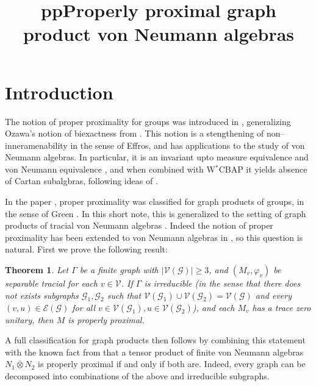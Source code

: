 \documentclass[a4paper, 11pt, reqno]{amsart}
\title{pp}
\numberwithin{equation}{section}
\theoremstyle{plain}
\newtheorem{thm}{Theorem}[section]
\theoremstyle{remark}
\theoremstyle{definition}
\newcommand{\VV}{{\mathcal V}}
\newcommand{\EE}{{\mathcal E}}
\newcommand{\GG}{{\mathcal G}}
\begin{document}
\title[Properly proximal graph product von Neumann algebras]{Properly proximal graph product von Neumann algebras}





\maketitle

\section{Introduction}

The notion of proper proximality for groups was introduced in \cite{BIP21}, generalizing Ozawa's notion of biexactness from \cite{Oza04}. This notion is a stengthening of non--inneramenability  in the sense of Effros, and has applications to the study of von Neumann algebras. In particular, it is an invariant upto measure equivalence and von Neumann equivalence \cite{IsPeRu19}, and when combined with W$^*$CBAP it yields absence of Cartan subalgbras, following ideas of \cite{OzPo10a}. 

In the paper \cite{DKE24properproximalgroups}, proper proximality was classified for graph products of groups, in the sense of Green \cite{Gr90}. In this short note, this is generalized to the setting of graph products of tracial von Neumann algebras \cite{CaFi17}. Indeed the notion of proper proximality has been extended to von Neumann algebras in \cite{DKEP23}, so this question is natural. First we prove the following result:

 \begin{thm}
     Let $\Gamma$ be a finite graph with $|\VV(\GG)|\geq 3$, and $(M_v,\varphi_v)$ be separable tracial for each $v\in \VV$. If $\Gamma$ is irreducible (in the sense that there does not exists subgraphs $\GG_1,\GG_2$ such that $ \VV(\GG_1)\cup \VV(\GG_2)=\VV(\GG) $ and every $(v,u)\in \EE(\GG) $ for all $v\in\VV(\GG_1),u\in \VV(\GG_2)$), and each $M_v$ has a trace zero unitary, then $M$ is properly proximal.
 \end{thm}  

 A full classification for graph products then follows by combining this statement with the known fact from \cite{DKEP23} that a tensor product of finite von Neumann algebras $N_1\overline{\otimes}N_2$ is properly proximal if and only if both are. Indeed, every graph can be decomposed into combinations of the above and irreducible subgraphs. 
\end{document}
